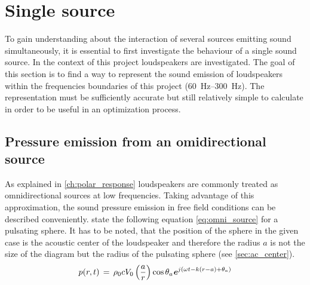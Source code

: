 \section{Single source}\label{ch:single_speaker_source}
To gain understanding about the interaction of several sources emitting sound simultaneously, it is essential to first investigate the behaviour of a single sound source. In the context of this project loudspeakers are investigated. The goal of this section is to find a way to represent the sound emission of loudspeakers within the frequencies boundaries of this project (\SIrange{60}{300}{\hertz}).
The representation must be sufficiently accurate but still relatively simple to calculate in order to be useful in an optimization process.

\subsection{Pressure emission from an omidirectional source}\label{ssec:omni}
As explained in \autoref{ch:polar_response} loudspeakers are commonly treated as omnidirectional sources at low frequencies. Taking advantage of this approximation, the sound pressure emission in free field conditions can be described conveniently. \citep[p. 171]{Kinsler2000} state the following equation \autoref{eq:omni_source} for a pulsating sphere. It has to be noted, that the position of the sphere in the given case is the acoustic center of the loudspeaker and therefore the radius $a$ is not the size of the diagram but the radius of the pulsating sphere (see \autoref{sec:ac_center}).
\begin{equation}\label{eq:omni_source}
p(r,t)\,=\,\rho_0 c V_0 \left(\frac{a}{r}\right)\cos \theta_a \textbf{\textit{e}}^{j\left(\omega t - k(r-a)+\theta_a\right)}
\end{equation}
\startexplain
{}
\stopexplain

